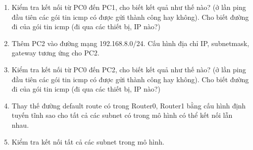 \begin{enumerate}
\bf \item Kiểm tra kết nối từ PC0 đến PC1, cho biết kết quả như thế nào? (ở lần ping đầu tiên các gói tin icmp có được gửi thành công hay không). Cho biết đường đi của gói tin icmp (đi qua các thiết bị, IP nào?)

\rm

\bf \item Thêm PC2 vào đường mạng 192.168.8.0/24. Cấu hình địa chỉ IP, subnetmask, gateway tương ứng cho PC2.

\rm

\bf \item Kiểm tra kết nối từ PC0 đến PC2, cho biết kết quả như thế nào? (ở lần ping đầu tiên các gói tin icmp có được gửi thành công hay không). Cho biết đường đi của gói tin icmp (đi qua các thiết bị, IP nào?)

\rm

\bf \item Thay thế đường default route có trong Router0, Router1 bằng cấu hình định tuyến tĩnh sao cho tất cả các subnet có trong mô hình có thể kết nối lẫn nhau.

\rm

\bf \item Kiểm tra kết nối tất cả các subnet trong mô hình.
\end{enumerate}
